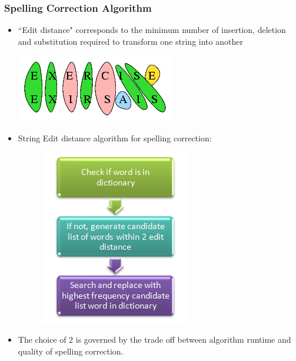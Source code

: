\documentclass{beamer}
\begin{document}
\begin{frame}
\frametitle{Spelling Correction Algorithm}

\begin{itemize}
 \justifying

\item ``Edit distance" corresponds to the minimum number of insertion, deletion and substitution required to transform one string into another\\
\begin{center}
\includegraphics[scale=0.35]{images/edit2.png}
\end{center}
\item String Edit distance algorithm for spelling correction:
\begin{figure}[ht]
\begin{center}
\includegraphics[scale=0.5]{images/editdistance.png}
\end{center}
\end{figure}

\item  The choice of 2 is governed by the trade off between algorithm
runtime and quality of spelling correction. 

\end{itemize}
\end{frame}
\end{document}

